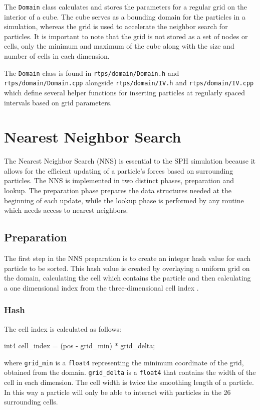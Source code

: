 The \verb|Domain| class calculates and stores the parameters for a regular grid
on the interior of a cube. The cube serves as a bounding domain for the
particles in a simulation, whereas the grid is used to accelerate the neighbor
search for particles. It is important to note that the grid is not stored as a
set of nodes or cells, only the minimum and maximum of the cube along with the
size and number of cells in each dimension.

The \verb|Domain| class is found in \verb|rtps/domain/Domain.h| and
\verb|rtps/domain/Domain.cpp| alongside \verb|rtps/domain/IV.h| and
\verb|rtps/domain/IV.cpp| which define several helper functions for inserting
particles at regularly spaced intervals based on grid parameters.


\section{Nearest Neighbor Search}
The Nearest Neighbor Search (NNS) is essential to the SPH simulation because it
allows for the efficient updating of a particle's forces based on surrounding
particles. The NNS is implemented in two distinct phases, preparation and
lookup. The preparation phase prepares the data structures needed at the
beginning of each update, while the lookup phase is performed by any routine
which needs access to nearest neighbors.

\subsection{Preparation}
The first step in the NNS preparation is to create an integer hash value for
each particle to be sorted. This hash value is created by overlaying a uniform
grid on the domain, calculating the cell which contains the particle and then
calculating a one dimensional index from the three-dimensional cell index \cite{Krog2010}.

\subsubsection{Hash}
The cell index is calculated as follows:
\begin{cppcode}{0}
int4 cell_index = (pos - grid_min) * grid_delta;
\end{cppcode}
\noindent where \verb|grid_min| is a \verb|float4| representing the minimum coordinate of
the grid, obtained from the domain. \verb|grid_delta| is a \verb|float4|
that contains the width of the cell in each dimension. The cell width is
twice the smoothing length of a particle. In this way a particle
will only be able to interact with particles in the 26 surrounding cells.


